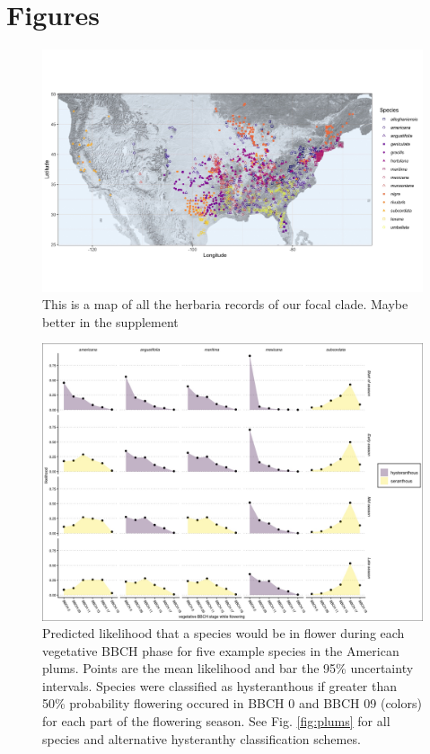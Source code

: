 \documentclass{article}[11pt]
\begin{document}
 

\newpage
\section*{Figures}
    \begin{figure}[h!]
    \centering
 \includegraphics[width=\textwidth]{..//..//Plots/Prunus-Map-raster-plasma.jpeg}
    \caption{This is a map of all the herbaria records of our focal clade. Maybe better in the supplement }
    \label{fig:mappy}
\end{figure}

\begin{figure}[h!]
    \centering
 \includegraphics[width=\textwidth]{..//..//Plots/ord_quants_exmpsps.jpeg}
    \caption{Predicted likelihood that a species would be in flower during each vegetative BBCH phase for five example species in the American plums. Points are the mean likelihood and bar the 95\% uncertainty intervals. Species were classified as hysteranthous if greater than 50\% probability flowering occured in BBCH 0 and BBCH 09 (colors) for each part of the flowering season.
  See Fig. \ref{fig:plums} for all species and alternative hysteranthy classification schemes. }
    \label{fig:ordinals}
\end{figure}
\end{document}
